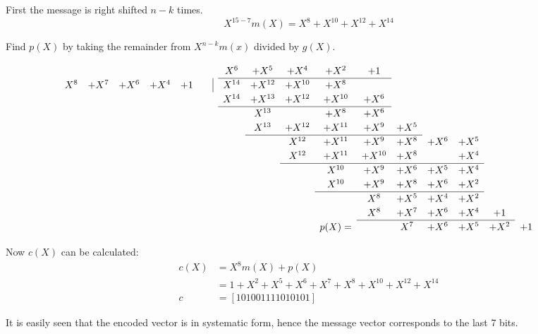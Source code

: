 \documentclass[Main]{subfiles}
\begin{document}
\noindent First the message is right shifted $n-k$ times.
\begin{equation}
X^{15-7}m(X) = X^8+X^{10}+X^{12}+X^{14}
\end{equation}

\noindent Find $p(X)$ by taking the remainder from $X^{n-k}m(x)$ divided by $g(X)$.

\[
\renewcommand\arraystretch{1.2}
\begin{array}{cccccccccccccccccc}
& & & & & X^6 & + X^5 &  +X^4 & +X^2 & +1 & & & & & & & \\
\cline{6-10}
 X^8 & + X^7 & +X^6 & +X^4 & +1 \qquad \vline & X^{14} & +X^{12} & +X^{10} & + X^8 & & & & & & & & \\
& & & & & X^{14} & + X^{13}& + X^{12} & +X^{10} & +X^6 & & & & & & & \\
\cline{6-10}
& & & & & & X^{13} & & +X^8 & +X^6 & & & & & & &\\
&  &&    &&    &  X^{13} & +X^{12} & +X^{11} & +X^9 & +X^5 & \\
\cline{7-11}
& & &&  &&    &  X^{12} & +X^{11} & +X^9 & +X^8 & +X^6 & +X^5  \\
& & &&  &&    &  X^{12} & +X^{11} & +X^{10} & +X^8 & & +X^4  \\
\cline{8-13}
&  &&    &    &   & &  & X^{10} & +X^9 & +X^6 & +X^5 & +X^4 \\
&  &&    &    &   & &  & X^{10} & +X^9 & +X^8 & +X^6 & +X^2 \\
\cline{9-13}
&  &&    &    &   & & & & X^{8} & +X^5 & +X^4 & +X^2 \\
&  &&    &    &   & & & & X^{8} & +X^7 & +X^6 & +X^4 & +1 \\
\cline{10-14}
&  &&  & & & & & p(X) = & & X^{7} & +X^6 & +X^5 & +X^2 & +1 \\
\end{array}
\]

\noindent Now $c(X)$ can be calculated:
\begin{align}
c(X) &= X^8m(X)+p(X)\\ 
	&= 1 + X^2 + X^5 + X^6 + X^7 + X^8 + X^{10}+ X^{12} + X^{14} \\
c &= [1 0 1 0 0 1 1 1 1 0 1 0 1 0 1]
\end{align}

\noindent It is easily seen that the encoded vector is in systematic form, hence the message vector corresponds to the last 7 bits.
\end{document}
